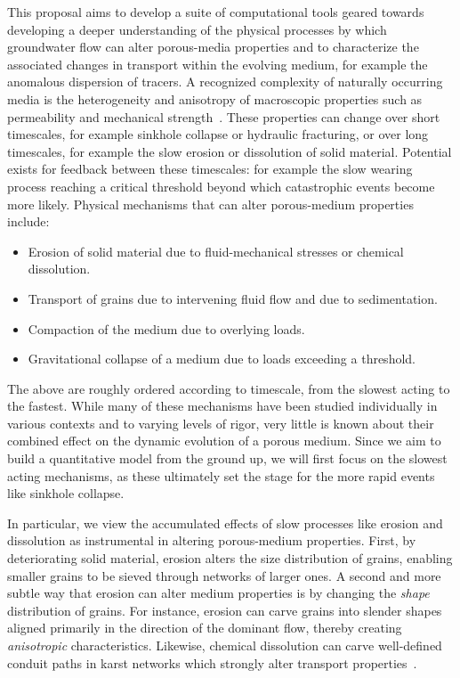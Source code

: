 \documentclass[11pt]{article}
\begin{document}
This proposal aims to develop a suite of computational tools geared towards developing a deeper understanding of the physical processes by which groundwater flow can alter porous-media properties and to characterize the associated changes in transport within the evolving medium, for example the anomalous dispersion of tracers. A recognized complexity of naturally occurring media is the heterogeneity and anisotropy of macroscopic properties such as permeability and mechanical strength~\cite{lin2018randomization}. These properties can change over short timescales, for example sinkhole collapse or hydraulic fracturing, or over long timescales, for example the slow erosion or dissolution of solid material. Potential exists for feedback between these timescales: for example the slow wearing process reaching a critical threshold beyond which catastrophic events become more likely.  Physical mechanisms that can alter porous-medium properties include: 
\begin{itemize}[noitemsep]
\item Erosion of solid material due to fluid-mechanical stresses or chemical dissolution.
\item Transport of grains due to intervening fluid flow and due to sedimentation.
\item Compaction of the medium due to overlying loads.
\item Gravitational collapse of a medium due to loads exceeding a threshold.
\end{itemize}
The above are roughly ordered according to timescale, from the slowest acting to the fastest. While many of these mechanisms have been studied individually in various contexts and to varying levels of rigor, very little is known about their combined effect on the dynamic evolution of a porous medium. Since we aim to build a quantitative model from the ground up, we will first focus on the slowest acting mechanisms, as these ultimately set the stage for the more rapid events like sinkhole collapse. 

In particular, we view the accumulated effects of slow processes like erosion and dissolution as instrumental in altering porous-medium properties. First, by deteriorating solid material, erosion alters the size distribution of grains, enabling smaller grains to be sieved through networks of larger ones. A second and more subtle way that erosion can alter medium properties is by changing the {\em shape} distribution of grains. For instance, erosion can carve grains into slender shapes aligned primarily in the direction of the dominant flow, thereby creating {\em anisotropic} characteristics. Likewise, chemical dissolution can carve well-defined conduit paths in karst networks which strongly alter transport properties~\cite{szymczak2009wormhole}.
\end{document}
